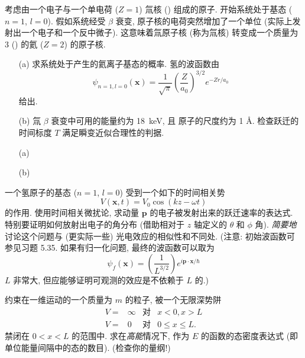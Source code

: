 \documentclass{assignment}
\begin{document}
\begin{prob}[课本习题 5.35]
    考虑由一个电子与一个单电荷 ($Z=1$) 氚核 () 组成的原子. 开始系统处于基态 ($n=1$, $l=0$). 假如系统经受 $\beta$ 衰变, 原子核的电荷突然增加了一个单位 (实际上发射出一个电子和一个反中微子). 这意味着氚原子核 (称为氚核) 转变成一个质量为 $3$ () 的氦 ($Z=2$) 的原子核.
    \begin{itemize}
        \item[(a)] 求系统处于产生的氦离子基态的概率. 氢的波函数由
        \[
            \psi_{n=1,l=0}(\bm{x})=\frac{1}{\sqrt{\pi}}\left(\frac{Z}{a_0}\right)^{3/2}e^{-Zr/a_0}
        \]
        给出.
        \item[(b)] 氚 $\beta$ 衰变中可用的能量约为 \SI{18}{keV}, 且  原子的尺度约为 1 \AA. 检查跃迁的时间标度 $T$ 满足瞬变近似合理性的判据.
    \end{itemize}
\end{prob}
\begin{itemize}
    \item[(a)] 
    \item[(b)] 
\end{itemize}

\begin{prob}[课本习题 5.38]
    一个氢原子的基态 ($n=1$, $l=0$) 受到一个如下的时间相关势
    \[
        V(\bm{x},t)=V_0\cos(kz-\omega t)
    \]
    的作用. 使用时间相关微扰论, 求动量 $\bm{p}$ 的电子被发射出来的跃迁速率的表达式. 特别要证明如何放射出电子的角分布 (借助相对于 $z$ 轴定义的 $\theta$ 和 $\phi$ 角). \textit{简要地}讨论这个问题与 (更实际一些) 光电效应的相似性和不同处. (注意: 初始波函数可参见习题 5.35. 如果有归一化问题, 最终的波函数可以取为
    \[
        \psi_f(\bm{x})=\left(\frac{1}{L^{3/2}}\right)e^{i\bm{p}\cdot\bm{x}/\hbar}
    \]
    $L$ 非常大, 但应能够证明可观测的效应是不依赖于 $L$ 的.)
\end{prob}
\begin{sol}
    
\end{sol}

\begin{prob}[课本习题 5.39]
    约束在一维运动的一个质量为 $m$ 的粒子, 被一个无限深势阱
    \begin{align*}
        V=&\infty&\text{对}&x<0,x>L\\
        V=&0&\text{对}&0\leq x\leq L.
    \end{align*}
    禁闭在 $0<x<L$ 的范围中. 求在\textit{高能}情况下, 作为 $E$ 的函数的态密度表达式 (即单位能量间隔中的态的数目). (检查你的量纲!)
\end{prob}
\begin{sol}
    
\end{sol}
\end{document}
